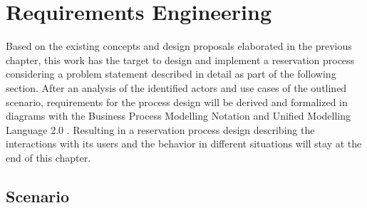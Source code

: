 
\chapter{Requirements Engineering}
\label{ch:Requirements Engineering}

Based on the existing concepts and design proposals elaborated in the previous chapter, this work has the target to design and implement a reservation process considering a problem statement described in detail as part of the following section. 
After an analysis of the identified actors and use cases of the outlined scenario, requirements for the process design will be derived and formalized in diagrams with the Business Process Modelling Notation \cite{noauthor_bpmn_nodate} and Unified Modelling Language 2.0 \cite{noauthor_welcome_nodate}.
Resulting in a reservation process design describing the interactions with its users and the behavior in different situations will stay at the end of this chapter. 

\section{Scenario}
\label{ch:Requirements Engineering:sec:Scenario}

